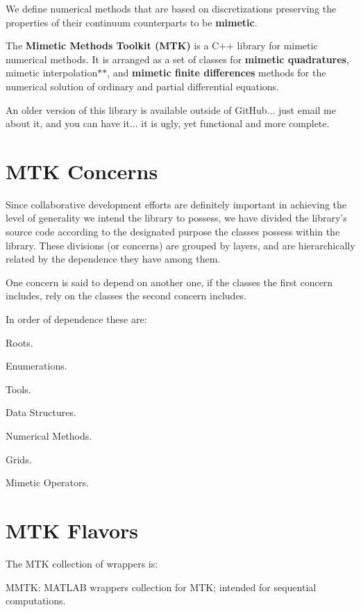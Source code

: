 We define numerical methods that are based on discretizations preserving the properties of their continuum counterparts to be {\bfseries mimetic}.

The {\bfseries Mimetic Methods Toolkit (M\+T\+K)} is a C++ library for mimetic numerical methods. It is arranged as a set of classes for {\bfseries mimetic quadratures}, mimetic interpolation$\ast$$\ast$, and {\bfseries mimetic finite differences} methods for the numerical solution of ordinary and partial differential equations.

An older version of this library is available outside of Git\+Hub... just email me about it, and you can have it... it is ugly, yet functional and more complete.\hypertarget{index_section_mtk_concerns}{}\section{M\+T\+K Concerns}\label{index_section_mtk_concerns}
Since collaborative development efforts are definitely important in achieving the level of generality we intend the library to possess, we have divided the library's source code according to the designated purpose the classes possess within the library. These divisions (or concerns) are grouped by layers, and are hierarchically related by the dependence they have among them.

One concern is said to depend on another one, if the classes the first concern includes, rely on the classes the second concern includes.

In order of dependence these are\+:


\begin{DoxyEnumerate}
\item Roots.
\item Enumerations.
\item Tools.
\item Data Structures.
\item Numerical Methods.
\item Grids.
\item Mimetic Operators.
\end{DoxyEnumerate}\hypertarget{index_section_flavors}{}\section{M\+T\+K Flavors}\label{index_section_flavors}
The M\+T\+K collection of wrappers is\+:


\begin{DoxyEnumerate}
\item M\+M\+T\+K\+: M\+A\+T\+L\+A\+B wrappers collection for M\+T\+K; intended for sequential computations.
\end{DoxyEnumerate}

